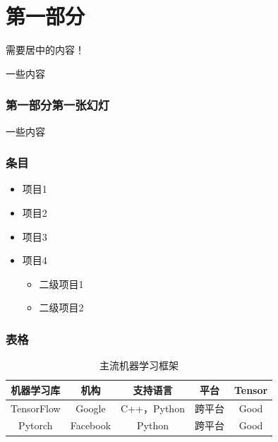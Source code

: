 
\section{第一部分}
\begin{frame}
  \begin{center}
  需要居中的内容！
  \end{center}
\end{frame}

\begin{frame}
  \centering
  一些内容
\end{frame}

\begin{frame}
  \frametitle{第一部分第一张幻灯}
    一些内容
  \end{frame}

\begin{frame}
  \frametitle{条目}
  \begin{itemize}
  \item 项目1
  \item 项目2
  \item 项目3
  \item 项目4
    \begin{itemize}
    \item 二级项目1
    \item 二级项目2
    \end{itemize}
  \end{itemize}
\end{frame}

\begin{frame}
  \frametitle{表格}
  \begin{table}[htbp!]
    \centering
    \caption{主流机器学习框架}
    \begin{tabular}{c|c|c|c|c}
      \toprule[1pt]
      机器学习库	& 机构 & 支持语言  & 平台 & Tensor \\
      \toprule[1pt]
      TensorFlow	& Google & C++，Python &跨平台 & Good \\
 	  \hline
      Pytorch	&  Facebook& Python & 跨平台 & Good \\
 	  \bottomrule[1pt]
    \end{tabular}
  \end{table}
\end{frame}


